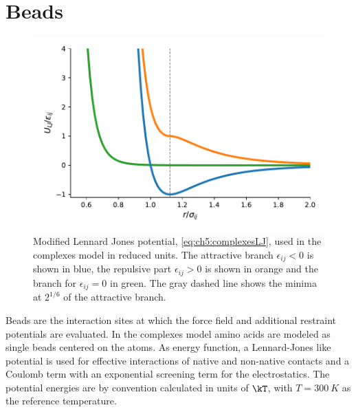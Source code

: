 \documentclass[12pt, twoside]{report}
\begin{document}
\section{Beads}
\begin{figure}[!ht] \centering
\includegraphics{figures/lennard-jones.pdf}
\caption[Modified Lennard Jones potential used in \complexes.]{Modified Lennard
Jones potential, \cref{eq:ch5:complexesLJ}, used in the complexes model in
reduced units. The attractive branch \(\epsilon_{ij}<0\) is shown in blue, the
repulsive part \(\epsilon_{ij}>0\) is shown in orange and the branch for
\(\epsilon_{ij}=0\) in green. The gray dashed line shows the minima at
\(2^{1/6}\) of the attractive branch.}
\label{fig:lennard-jones}
\end{figure} Beads are the interaction sites at which the force field and
additional restraint potentials are evaluated. In the complexes model
\cite{Kim2008} amino acids are modeled as single beads centered on the \calpha
atoms. As energy function, a Lennard-Jones like potential is used for effective
interactions of native and non-native contacts and a Coulomb term with an
exponential screening term for the electrostatics. The potential energies are by
convention calculated in units of \(\kT\), with \(T=\SI{300}{K}\) as the
reference temperature.
\end{document}
